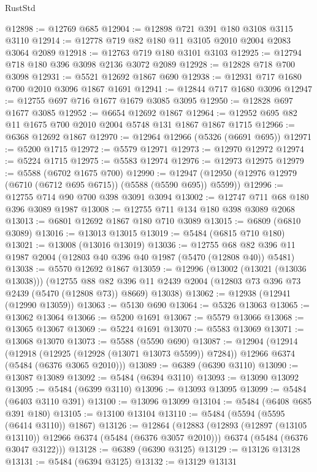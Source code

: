\begin{lexlean}{RustStd}
\begin{coremodule}
@12898 := @12769 @685
@12904 := @12898 @721 @391 @180 @3108 @3115 @3110
@12914 := @12778 @719 @82 @180 @11 @3105 @2010 @2004 @2083 @3064 @2089
@12918 := @12763 @719 @180 @3101 @3103
@12925 := @12794 @718 @180 @396 @3098 @2136 @3072 @2089
@12928 := @12828 @718 @700 @3098
@12931 := @5521 @12692 @1867 @690
@12938 := @12931 @717 @1680 @700 @2010 @3096 @1867 @1691
@12941 := @12844 @717 @1680 @3096
@12947 := @12755 @697 @716 @1677 @1679 @3085 @3095
@12950 := @12828 @697 @1677 @3085
@12952 := @6654 @12692 @1867
@12964 := @12952 @695 @82 @11 @1675 @700 @2010 @2004 @5748 @131 @1867 @1867 @1715
@12966 := @6368 @12692 @1867
@12970 := @12964 @12966 (@5326 (@6691 @695))
@12971 := @5200 @1715
@12972 := @5579 @12971
@12973 := @12970 @12972
@12974 := @5224 @1715
@12975 := @5583 @12974
@12976 := @12973 @12975
@12979 := @5588 (@6702 @1675 @700)
@12990 := @12947 (@12950 (@12976 @12979 (@6710 (@6712 @695 @6715)) (@5588 (@5590 @695)) @5599))
@12996 := @12755 @714 @90 @700 @398 @3091 @3094
@13002 := @12747 @711 @68 @180 @396 @3089 @1987
@13008 := @12755 @711 @134 @180 @398 @3089 @2068
@13013 := @6801 @12692 @1867 @180 @710 @3089
@13015 := @6809 (@6810 @3089)
@13016 := @13013 @13015
@13019 := @5484 (@6815 @710 @180)
@13021 := @13008 (@13016 @13019)
@13036 := @12755 @68 @82 @396 @11 @1987 @2004 (@12803 @40 @396 @40 @1987 (@5470 (@12808 @40)) @5481)
@13038 := @5570 @12692 @1867
@13059 := @12996
    (@13002 (@13021 (@13036 @13038)))
    (@12755
      @88
      @82
      @396
      @11
      @2439
      @2004
      (@12803 @73 @396 @73 @2439 (@5470 (@12808 @73)) @8669)
      @13038)
@13062 := @12938 (@12941 (@12990 @13059))
@13063 := @5130 @690
@13064 := @5326 @13063
@13065 := @13062 @13064
@13066 := @5200 @1691
@13067 := @5579 @13066
@13068 := @13065 @13067
@13069 := @5224 @1691
@13070 := @5583 @13069
@13071 := @13068 @13070
@13073 := @5588 (@5590 @690)
@13087 := @12904
    (@12914
      (@12918 (@12925 (@12928 (@13071 @13073 @5599)) @7284))
      @12966
      @6374
      (@5484 (@6376 @3065 @2010)))
@13089 := @6389 (@6390 @3110)
@13090 := @13087 @13089
@13092 := @5484 (@6394 @3110)
@13093 := @13090 @13092
@13095 := @5484 (@6399 @3110)
@13096 := @13093 @13095
@13099 := @5484 (@6403 @3110 @391)
@13100 := @13096 @13099
@13104 := @5484 (@6408 @685 @391 @180)
@13105 := @13100 @13104
@13110 := @5484 (@5594 (@5595 (@6414 @3110)) @1867)
@13126 := @12864
    (@12883
      (@12893 (@12897 (@13105 @13110)) @12966 @6374 (@5484 (@6376 @3057 @2010)))
      @6374
      (@5484 (@6376 @3047 @3122)))
@13128 := @6389 (@6390 @3125)
@13129 := @13126 @13128
@13131 := @5484 (@6394 @3125)
@13132 := @13129 @13131

\end{coremodule}
\end{lexlean}
